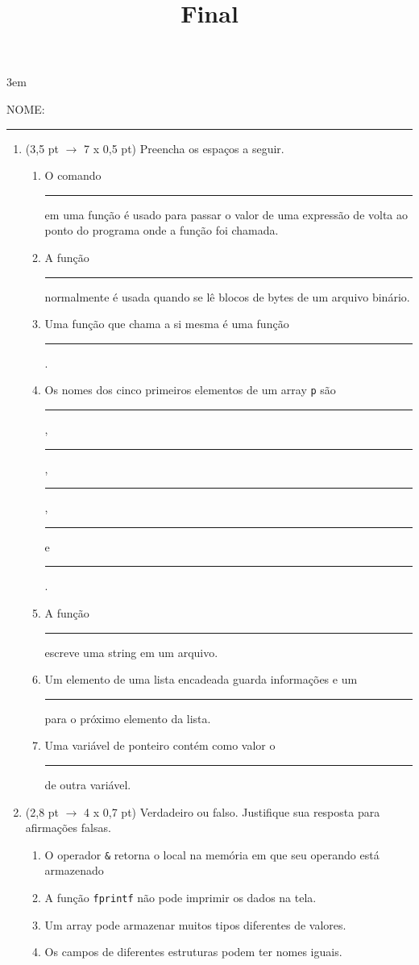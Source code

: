 \documentclass[a4paper,10pt]{article}
\title{Final}
\begin{document}
\maketitle

\emergencystretch 3em



NOME: \rule{.85\textwidth}{0.1mm}

\begin{multicols*}{2}
\setlength{\leftmargini}{0pt}
\begin{enumerate}
  \item (3,5 pt $\rightarrow$ 7 x 0,5 pt) Preencha os espaços a seguir.

  \begin{enumerate}
    \item O comando \rule{1cm}{0.2mm} em uma função é usado para passar o valor de uma expressão de volta ao ponto do programa onde a função foi chamada. %
    \item A função \rule{1cm}{0.2mm} normalmente é usada quando se lê blocos de bytes de um arquivo binário. %
    \item Uma função que chama a si mesma é uma função \rule{1cm}{0.2mm}. %
    \item Os nomes dos cinco primeiros elementos de um array \texttt{p} são \rule{1cm}{0.2mm}, \rule{1cm}{0.2mm}, \rule{1cm}{0.2mm}, \rule{1cm}{0.2mm} e \rule{1cm}{0.2mm}. %
    \item A função \rule{1cm}{0.2mm} escreve uma string em um arquivo. %
    \item Um elemento de uma lista encadeada guarda informações e um \rule{1cm}{0.2mm} para o próximo elemento da lista. %
    \item Uma variável de ponteiro contém como valor o \rule{1cm}{0.2mm} de outra variável. %
  \end{enumerate}

  \item (2,8 pt $\rightarrow$ 4 x 0,7 pt) Verdadeiro ou falso. Justifique sua resposta para afirmações falsas.

  \begin{enumerate}
    \item O operador \texttt{\&} retorna o local na memória em que seu operando está armazenado %
    \item A função \texttt{fprintf} não pode imprimir os dados na tela. %
    \item Um array pode armazenar muitos tipos diferentes de valores. %
    \item Os campos de diferentes estruturas podem ter nomes iguais. %
  \end{enumerate}


\end{enumerate}
\end{multicols*}
\end{document}
